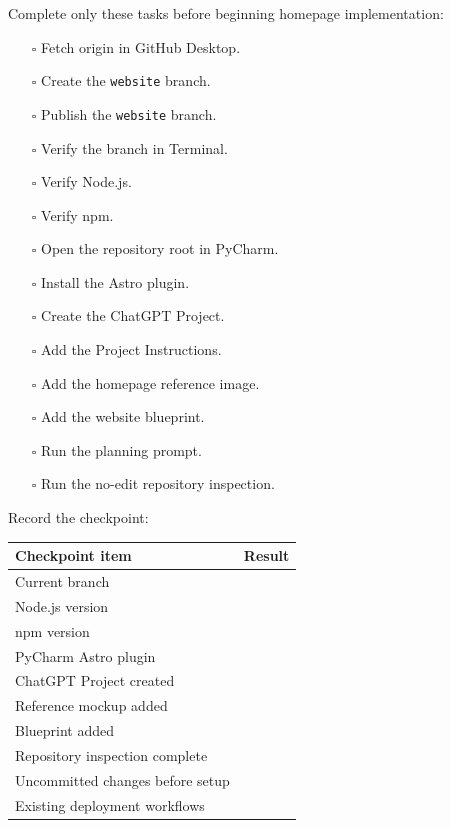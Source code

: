 \documentclass[11pt,letterpaper]{article}
\newcommand{\checkbox}{\(\square\)}
\newcommand{\branchname}[1]{\texttt{#1}}
\begin{document}
Complete only these tasks before beginning homepage implementation:

\begin{itemize}
    \item[\checkbox] Fetch origin in GitHub Desktop.
    \item[\checkbox] Create the \branchname{website} branch.
    \item[\checkbox] Publish the \branchname{website} branch.
    \item[\checkbox] Verify the branch in Terminal.
    \item[\checkbox] Verify Node.js.
    \item[\checkbox] Verify npm.
    \item[\checkbox] Open the repository root in PyCharm.
    \item[\checkbox] Install the Astro plugin.
    \item[\checkbox] Create the ChatGPT Project.
    \item[\checkbox] Add the Project Instructions.
    \item[\checkbox] Add the homepage reference image.
    \item[\checkbox] Add the website blueprint.
    \item[\checkbox] Run the planning prompt.
    \item[\checkbox] Run the no-edit repository inspection.
\end{itemize}

Record the checkpoint:

\begin{longtable}{L{2.5in}L{3.5in}}
\toprule
\textbf{Checkpoint item} & \textbf{Result} \\
\midrule
Current branch & \\
Node.js version & \\
npm version & \\
PyCharm Astro plugin & \\
ChatGPT Project created & \\
Reference mockup added & \\
Blueprint added & \\
Repository inspection complete & \\
Uncommitted changes before setup & \\
Existing deployment workflows & \\
\bottomrule
\end{longtable}

\end{document}
